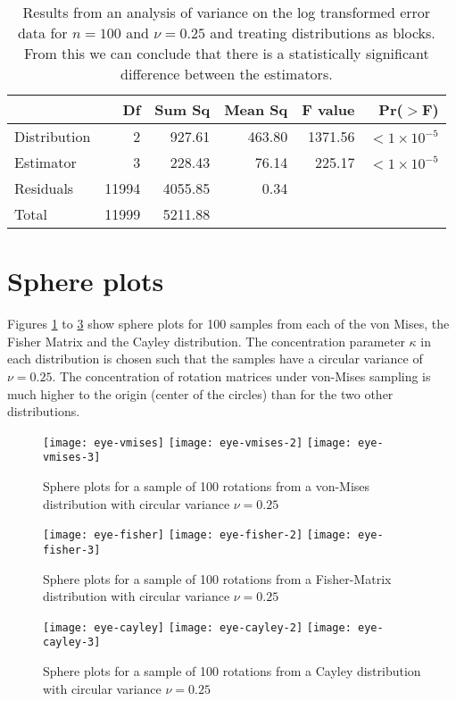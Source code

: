 \begin{table}[h!]
\caption{Results from an analysis of variance on the log transformed error data for $n=100$ and $\nu=0.25$ and treating distributions as blocks.  From this we can conclude that there is a statistically significant difference between the estimators.}
\begin{center}
\begin{tabular}{lrrrrr}
  \hline
 & Df & Sum Sq & Mean Sq & F value & Pr($>$F) \\ 
  \hline
Distribution       & 2 & 927.61 & 463.80 & 1371.56 & $<1\times 10^{-5}$ \\ 
Estimator   & 3 & 228.43 & 76.14 & 225.17 & $<1\times 10^{-5}$ \\ 
Residuals   & 11994 & 4055.85 & 0.34 &  &  \\ \hline
Total & 11999 & 5211.88 &&&\\
   \hline
\end{tabular}
\end{center}
\end{table}


\section{Sphere plots}
\label{sec:appendix.eyeballs}
Figures \ref{fig:eye-vmises} to \ref{fig:eye-cayley} show sphere plots for 100 samples from each of the von Mises, the Fisher Matrix and the Cayley distribution. The concentration parameter $\kappa$ in each distribution is chosen such that the samples have a circular variance of $\nu = 0.25$. The concentration of rotation matrices under von-Mises sampling is much higher to the origin (center of the circles) than for the two other distributions.
\begin{figure}
\texttt{[image: eye-vmises]}
\texttt{[image: eye-vmises-2]}
\texttt{[image: eye-vmises-3]}
\caption{\label{fig:eye-vmises}Sphere plots for a sample of 100 rotations from a von-Mises distribution with circular variance $\nu=0.25$}
\end{figure}
\begin{figure}
\texttt{[image: eye-fisher]}
\texttt{[image: eye-fisher-2]}
\texttt{[image: eye-fisher-3]}
\caption{\label{fig:eye-fisher}Sphere plots for a sample of 100 rotations from a Fisher-Matrix distribution with circular variance $\nu=0.25$}
\end{figure}
\begin{figure}
\texttt{[image: eye-cayley]}
\texttt{[image: eye-cayley-2]}
\texttt{[image: eye-cayley-3]}
\caption{\label{fig:eye-cayley}Sphere plots for a sample of 100 rotations from a Cayley distribution with circular variance $\nu=0.25$}
\end{figure}
